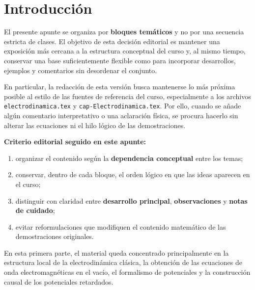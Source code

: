 \documentclass[../main.tex]{subfiles}
\begin{document}
\chapter*{Introducción}

El presente apunte se organiza por \textbf{bloques temáticos} y no por una secuencia estricta de clases. El objetivo de esta decisión editorial es mantener una exposición más cercana a la estructura conceptual del curso y, al mismo tiempo, conservar una base suficientemente flexible como para incorporar desarrollos, ejemplos y comentarios sin desordenar el conjunto.

En particular, la redacción de esta versión busca mantenerse lo más próxima posible al estilo de las fuentes de referencia del curso, especialmente a los archivos \texttt{electrodinamica.tex} y \texttt{cap-Electrodinamica.tex}. Por ello, cuando se añade algún comentario interpretativo o una aclaración física, se procura hacerlo sin alterar las ecuaciones ni el hilo lógico de las demostraciones.

\begin{cajaidea}
\textbf{Criterio editorial seguido en este apunte:}
\begin{enumerate}[label=\arabic*.]
    \item organizar el contenido según la \textbf{dependencia conceptual} entre los temas;
    \item conservar, dentro de cada bloque, el orden lógico en que las ideas aparecen en el curso;
    \item distinguir con claridad entre \textbf{desarrollo principal}, \textbf{observaciones} y \textbf{notas de cuidado};
    \item evitar reformulaciones que modifiquen el contenido matemático de las demostraciones originales.
\end{enumerate}
\end{cajaidea}

En esta primera parte, el material queda concentrado principalmente en la estructura local de la electrodinámica clásica, la obtención de las ecuaciones de onda electromagnéticas en el vacío, el formalismo de potenciales y la construcción causal de los potenciales retardados.

\newpage
\end{document}
